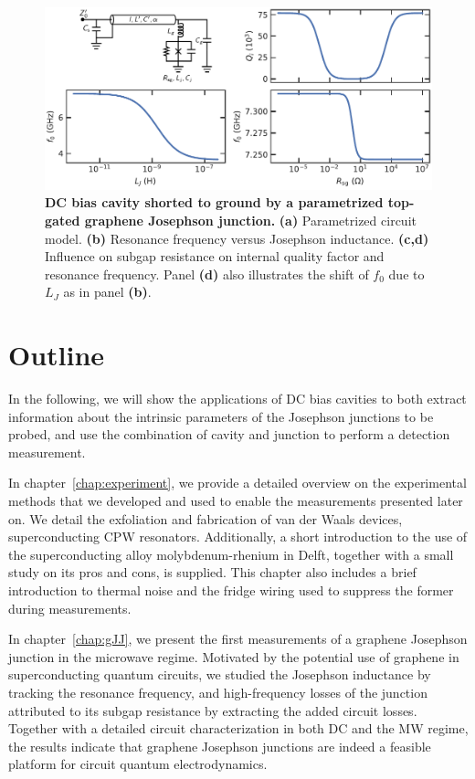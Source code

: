 \begin{figure}
	\centering
	\includegraphics[width=\linewidth]{chapter-introduction/figs/model_DC_bias_cavity_params_RCSJ.pdf}
	\caption{
		\textbf{DC bias cavity shorted to ground by a parametrized top-gated graphene Josephson junction.}
		\textbf{(a)} Parametrized circuit model.
		\textbf{(b)} Resonance frequency versus Josephson inductance.
		\textbf{(c,d)} Influence on subgap resistance on internal quality factor and resonance frequency.
		Panel \textbf{(d)} also illustrates the shift of $f_0$ due to $L_J$ as in panel \textbf{(b)}.
	}
	\label{fig:TLmodel}
\end{figure}


\section{Outline}

In the following, we will show the applications of DC bias cavities to both extract information about the intrinsic parameters of the Josephson junctions to be probed, and use the combination of cavity and junction to perform a detection measurement.


In chapter~\ref{chap:experiment}, we provide a detailed overview on the experimental methods that we developed and used to enable the measurements presented later on.
%
We detail the exfoliation and fabrication of van der Waals devices, superconducting CPW resonators.
%
Additionally, a short introduction to the use of the superconducting alloy molybdenum-rhenium in Delft, together with a small study on its pros and cons, is supplied.
%
This chapter also includes a brief introduction to thermal noise and the fridge wiring used to suppress the former during measurements.

In chapter~\ref{chap:gJJ}, we present the first measurements of a graphene Josephson junction in the microwave regime.
%
Motivated by the potential use of graphene in superconducting quantum circuits, we studied the Josephson inductance by tracking the resonance frequency, and high-frequency losses of the junction attributed to its subgap resistance by extracting the added circuit losses.
%
Together with a detailed circuit characterization in both DC and the MW regime, the results indicate that graphene Josephson junctions are indeed a feasible platform for circuit quantum electrodynamics.


